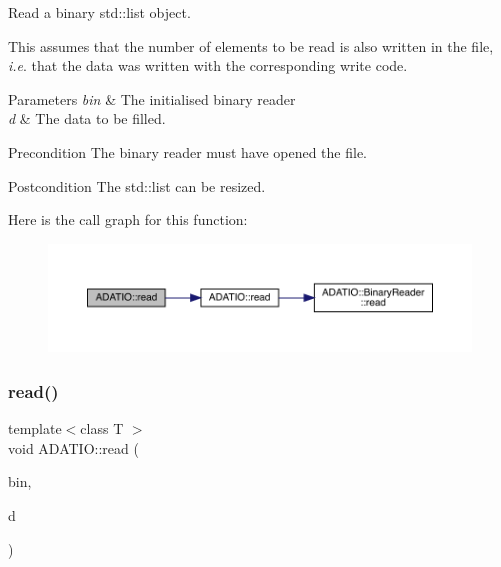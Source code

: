 Read a binary std\+::list object. 

This assumes that the number of elements to be read is also written in the file, {\itshape i.\+e}. that the data was written with the corresponding write code. 
\begin{DoxyParams}{Parameters}
{\em bin} & The initialised binary reader \\
\hline
{\em d} & The data to be filled.\\
\hline
\end{DoxyParams}
\begin{DoxyPrecond}{Precondition}
The binary reader must have opened the file. 
\end{DoxyPrecond}
\begin{DoxyPostcond}{Postcondition}
The std\+::list can be resized. 
\end{DoxyPostcond}
Here is the call graph for this function\+:\nopagebreak
\begin{figure}[H]
\begin{center}
\leavevmode
\includegraphics[width=350pt]{d0/dba/namespaceADATIO_a6b74b694d784ffa233957d276d10528d_cgraph}
\end{center}
\end{figure}
\mbox{\label{namespaceADATIO_aee4123faea4044073f3c166dab12cb9e}} 
\subsubsection{\texorpdfstring{read()}{read()}\hspace{0.1cm}{\footnotesize\ttfamily [26/28]}}
{\footnotesize\ttfamily template$<$class T $>$ \\
void A\+D\+A\+T\+I\+O\+::read (\begin{DoxyParamCaption}\item[{\mbox{\hyperlink{classADATIO_1_1BinaryReader}{Binary\+Reader}} \&}]{bin,  }\item[{\mbox{\hyperlink{classADAT_1_1Array1dO}{A\+D\+A\+T\+::\+Array1dO}}$<$ T $>$ \&}]{d }\end{DoxyParamCaption})\hspace{0.3cm}{\ttfamily [inline]}}



